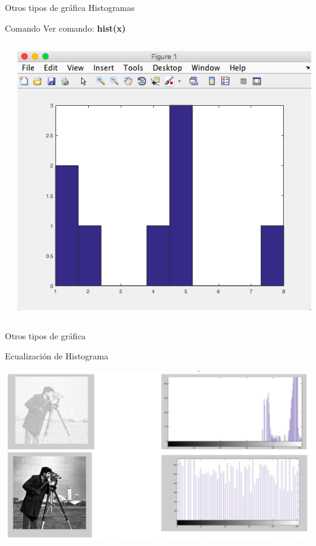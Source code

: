 \documentclass{bredelebeamer}
\begin{document}
\begin{frame}{Otros tipos de gráfica}
Histogramas
\begin{exampleblock}{Comando}
Ver comando: \textbf{hist(x)}
\end{exampleblock}
\begin{columns}
\begin{column}{0.5\textwidth}
\begin{center}
\end{center}
\end{column}
\begin{column}{0.5\textwidth}
\begin{center}
\includegraphics[scale=0.2]{images/pantalla26.png}
\end{center}
\end{column}
\end{columns}
\end{frame}



\begin{frame}{Otros tipos de gráfica}
\begin{center}
Ecualización de Histograma
\end{center}
\begin{center}
\includegraphics[scale=0.5]{images/img40.png}
\end{center}
\end{frame}
\end{document}
